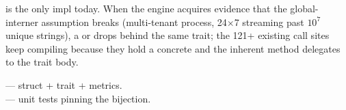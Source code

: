  is the only impl today. When the engine
acquires evidence that the global-interner assumption breaks
(multi-tenant process, 24$\times$7 streaming past $10^7$ unique
strings), a  or
 drops behind the same trait; the 121+
existing call sites keep compiling because they hold a concrete
 and the inherent  method
delegates to the trait body.

\begin{inthecode}
 --- struct + trait
+ metrics.\\
 --- unit tests
pinning the bijection.
\end{inthecode}
